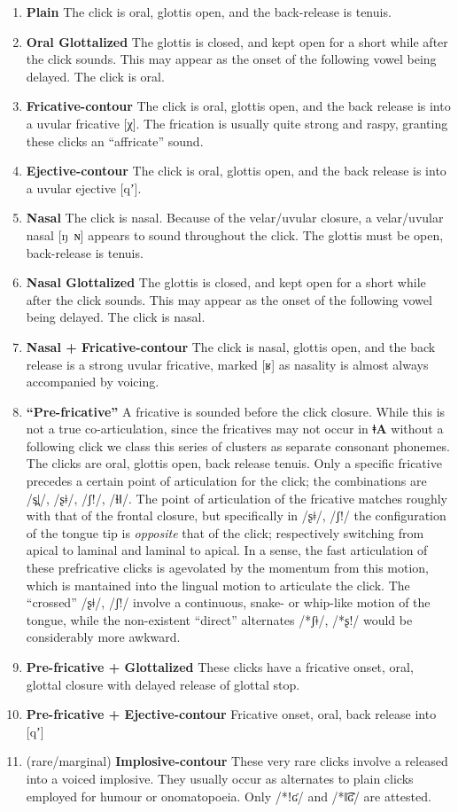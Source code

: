 \documentclass[11pt,a5paper]{book}
\newcommand{\qcn}[1]{\textcolor{AccentText}{\large\textbf{#1}}}
\newcommand{\langname}{\qcn{ǂA}}
\begin{document}
\begin{enumerate}[I]
\item \textbf{Plain} The click is oral, glottis open, and the back-release is tenuis.
\item \textbf{Oral Glottalized} The glottis is closed, and kept open for a short while after the click sounds. This may appear as the onset of the following vowel being delayed. The click is oral.
\item \textbf{Fricative-contour} The click is oral, glottis open, and the back release is into a uvular fricative [χ]. The frication is usually quite strong and raspy, granting these clicks an ``affricate'' sound.
\item \textbf{Ejective-contour} The click is oral, glottis open, and the back release is into a uvular ejective [qʼ].
\item \textbf{Nasal} The click is nasal. Because of the velar/uvular closure, a velar/uvular nasal [ŋ~ɴ] appears to sound throughout the click. The glottis must be open, back-release is tenuis.
\item \textbf{Nasal Glottalized} The glottis is closed, and kept open for a short while after the click sounds. This may appear as the onset of the following vowel being delayed. The click is nasal.
\item \textbf{Nasal + Fricative-contour} The click is nasal, glottis open, and the back release is a strong uvular fricative, marked [ʁ] as nasality is almost always accompanied by voicing.
\item \textbf{``Pre-fricative''} A fricative is sounded before the click closure. While this is not a true co-articulation, since the fricatives may not occur in \langname{} without a following click we class this series of clusters as separate consonant phonemes. The clicks are oral, glottis open, back release tenuis. Only a specific fricative precedes a certain point of articulation for the click; the combinations are /s̪ǀ/, /ʂǂ/, /ʃ!/, /ɬǁ/. The point of articulation of the fricative matches roughly with that of the frontal closure, but specifically in /ʂǂ/, /ʃ!/ the configuration of the tongue tip is \emph{opposite} that of the click; respectively switching from apical to laminal and laminal to apical. In a sense, the fast articulation of these prefricative clicks is agevolated by the momentum from this motion, which is mantained into the lingual motion to articulate the click. The ``crossed'' /ʂǂ/, /ʃ!/ involve a continuous, snake- or whip-like motion of the tongue, while the non-existent ``direct'' alternates /*ʃǂ/, /*ʂ!/ would be considerably more awkward.
\item \textbf{Pre-fricative + Glottalized} These clicks have a fricative onset, oral, glottal closure with delayed release of glottal stop.
\item \textbf{Pre-fricative + Ejective-contour} Fricative onset, oral, back release into [qʼ]
\item (rare/marginal) \textbf{Implosive-contour} These very rare clicks involve a released into a voiced implosive. They usually occur as alternates to plain clicks employed for humour or onomatopoeia. Only /*ǃʛ/ and /*‖͡ʛ/ are attested.
\end{enumerate}
\end{document}
